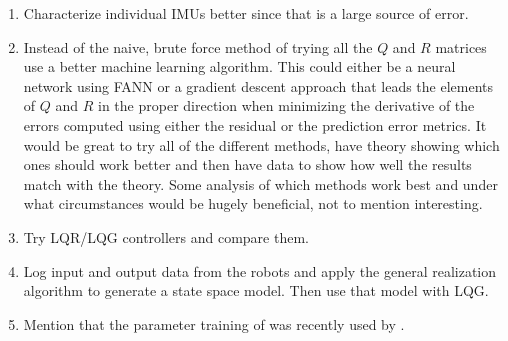 \begin{enumerate}
\item Characterize individual IMUs better since that is a large source of error.
\item Instead of the naive, brute force method of trying all the $Q$ and $R$ matrices use a better machine learning algorithm. This could either be a neural network using FANN or a gradient descent approach that leads the elements of $Q$ and $R$ in the proper direction when minimizing the derivative of the errors computed using either the residual or the prediction error metrics. It would be great to try all of the different methods, have theory showing which ones should work better and then have data to show how well the results match with the theory. Some analysis of which methods work best and under what circumstances would be hugely beneficial, not to mention interesting.
\item Try LQR/LQG controllers and compare them.
\item Log input and output data from the robots and apply the general realization algorithm \cite{deCallafonGRA08} to generate a state space model. Then use that model with LQG.
\item Mention that the parameter training of \cite{Abbeel-RSS-05} was recently used by \cite{SakaiKuroda10}.
\end{enumerate}
